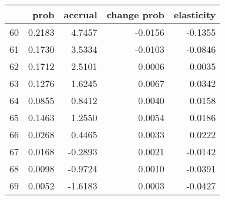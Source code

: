 \begin{tabular}{lrrrr}
\toprule
{} &    prob &  accrual &  change prob &  elasticity \\
\midrule
60 &  0.2183 &   4.7457 &      -0.0156 &     -0.1355 \\
61 &  0.1730 &   3.5334 &      -0.0103 &     -0.0846 \\
62 &  0.1712 &   2.5101 &       0.0006 &      0.0035 \\
63 &  0.1276 &   1.6245 &       0.0067 &      0.0342 \\
64 &  0.0855 &   0.8412 &       0.0040 &      0.0158 \\
65 &  0.1463 &   1.2550 &       0.0054 &      0.0186 \\
66 &  0.0268 &   0.4465 &       0.0033 &      0.0222 \\
67 &  0.0168 &  -0.2893 &       0.0021 &     -0.0142 \\
68 &  0.0098 &  -0.9724 &       0.0010 &     -0.0391 \\
69 &  0.0052 &  -1.6183 &       0.0003 &     -0.0427 \\
\bottomrule
\end{tabular}
